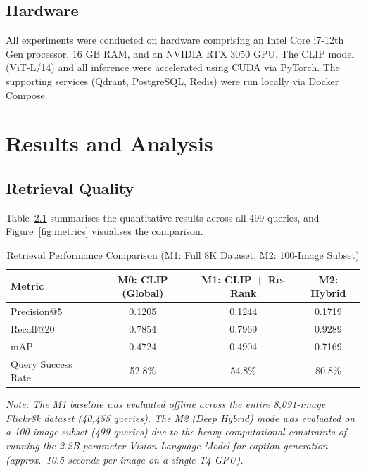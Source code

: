 \documentclass[12pt,a4paper,oneside]{report}
\begin{document}
\section{Hardware}

All experiments were conducted on hardware comprising an Intel Core i7-12th Gen processor, 16 GB RAM, and an NVIDIA RTX 3050 GPU. The CLIP model (ViT-L/14) and all inference were accelerated using CUDA via PyTorch. The supporting services (Qdrant, PostgreSQL, Redis) were run locally via Docker Compose.


\chapter{Results and Analysis}

\section{Retrieval Quality}

Table~\ref{tab:metrics} summarises the quantitative results across all 499 queries, and Figure~\ref{fig:metrics} visualises the comparison.

\begin{table}[H]
\centering
\caption{Retrieval Performance Comparison (M1: Full 8K Dataset, M2: 100-Image Subset)}
\label{tab:metrics}
\renewcommand{\arraystretch}{1.4}
\begin{tabular}{|l|c|c|c|}
\hline
\textbf{Metric} & \textbf{M0: CLIP (Global)} & \textbf{M1: CLIP + Re-Rank} & \textbf{M2: Hybrid} \\
\hline
Precision@5 & 0.1205 & 0.1244 & 0.1719 \\
\hline
Recall@20 & 0.7854 & 0.7969 & 0.9289 \\
\hline
mAP & 0.4724 & 0.4904 & 0.7169 \\
\hline
Query Success Rate & 52.8\% & 54.8\% & 80.8\% \\
\hline
\end{tabular}
\end{table}

\textit{Note: The M1 baseline was evaluated offline across the entire 8,091-image Flickr8k dataset (40,455 queries). The M2 (Deep Hybrid) mode was evaluated on a 100-image subset (499 queries) due to the heavy computational constraints of running the 2.2B parameter Vision-Language Model for caption generation (approx.\ 10.5 seconds per image on a single T4 GPU).}
\end{document}
